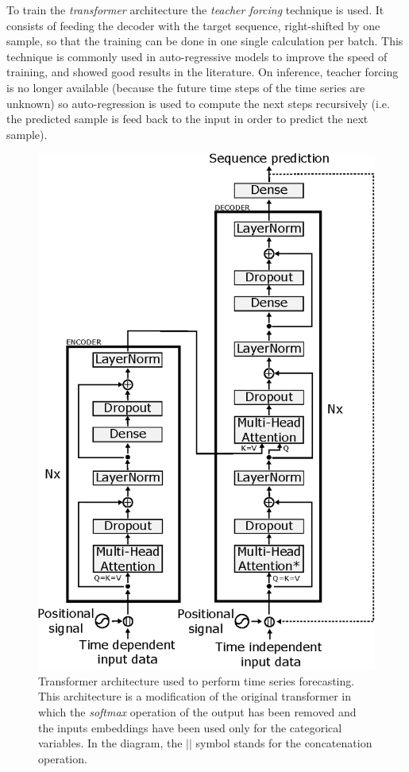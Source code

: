 \documentclass{elsarticle}
\begin{document}
	To train the \textit{transformer} architecture the \textit{teacher forcing} technique \cite{williams1989, goyal2016} is used. It consists of feeding the decoder with the target sequence, right-shifted by one sample, so that the training can be done in one single calculation per batch. This technique is commonly used in auto-regressive models to improve the speed of training, and showed good results in the literature. On inference, teacher forcing is no longer available (because the future time steps of the time series are unknown) so auto-regression is used to compute the next steps recursively (i.e. the predicted sample is feed back to the input in order to predict the next sample).
    
    \begin{figure}[h!]
    	\centering
    	\includegraphics[width=0.7\linewidth]{img/transformer}
    	\caption{Transformer architecture used to perform time series forecasting. This architecture is a modification of the original transformer in which the \textit{softmax} operation of the output has been removed and the inputs embeddings have been used only for the categorical variables. In the diagram, the $||$ symbol stands for the concatenation operation.}
    	\label{fig:transformer}
    \end{figure}
    
\end{document}
